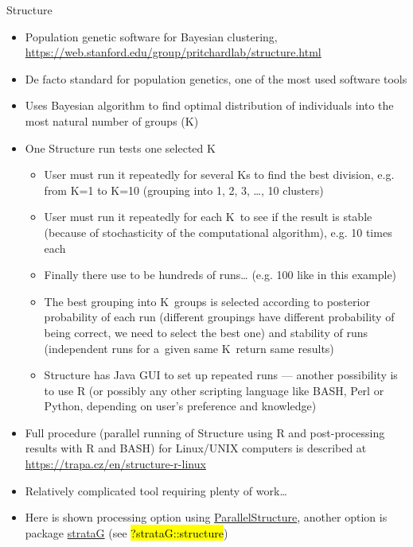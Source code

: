 \documentclass[compress, ucs, xelatex, 11pt, xcolor=svgnames,
	hyperref={
		bookmarks=true,
		unicode=true,
		colorlinks=true,
		pdftitle={Molecular data in R},
		plainpages=false,
		pdfauthor={Vojtech Zeisek},
		pdfsubject={Course about phylogeny and evolution in R},
		pdfcreator={XeLaTeX},
		pdfkeywords={R, evolution, phylogeny, molecular data},
		linkcolor=Tomato,
		anchorcolor=SaddleBrown,
		citecolor=Goldenrod,
		filecolor=DarkMagenta,
		menucolor=Sienna,
		urlcolor=DarkTurquoise,
		pdftex},
	url={hyphens, lowtilde} %
	]{beamer}
\renewcommand{\texttt}[1]{\hl{\ttfamily #1}}
\begin{document}
\begin{frame}[allowframebreaks]{Structure}
	\label{structure}
	\begin{itemize}
		\item Population genetic software for Bayesian clustering, \url{https://web.stanford.edu/group/pritchardlab/structure.html}
		\item De facto standard for population genetics, one of the most used software tools
		\item Uses Bayesian algorithm to find optimal distribution of individuals into the most natural number of groups (K)
		\item One Structure run tests one selected K
		\begin{itemize}
			\item User must run it repeatedly for several Ks to find the best division, e.g. from K=1 to K=10 (grouping into 1, 2, 3, \ldots, 10 clusters)
			\item User must run it repeatedly for each K~to see if the result is stable (because of stochasticity of the computational algorithm), e.g. 10 times each
			\item Finally there use to be hundreds of runs\ldots{ } (e.g. 100 like in this example)
			\item The best grouping into K~groups is selected according to posterior probability of each run (different groupings have different probability of being correct, we need to select the best one) and stability of runs (independent runs for a~given same K~return same results)
			\item Structure has Java GUI to set up repeated runs --- another possibility is to use R (or possibly any other scripting language like BASH, Perl or Python, depending on user's preference and knowledge)
		\end{itemize}
		\item Full procedure (parallel running of Structure using R and post-processing results with R and BASH) for Linux/UNIX computers is described at \url{https://trapa.cz/en/structure-r-linux}
		\item Relatively complicated tool requiring plenty of work\ldots
		\item Here is shown processing option using \href{https://r-forge.r-project.org/R/?group_id=1636}{ParallelStructure}, another option is package \href{https://CRAN.R-project.org/package=strataG}{strataG} (see \texttt{?strataG::structure})
	\end{itemize}
\end{frame}
\end{document}

